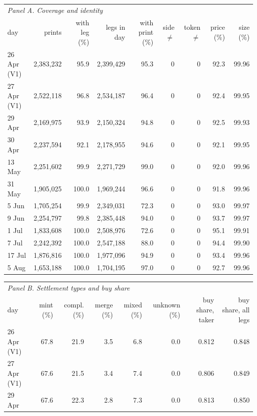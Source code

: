 \begin{table}[htbp]
\centering\scriptsize\setlength{\tabcolsep}{3pt}
\begin{tabular}{lrrrrrrrr}
\toprule
\multicolumn{9}{l}{\emph{Panel A. Coverage and identity}} \\
day & prints & with leg (\%) & legs in day & with print (\%) & side $\neq$ & token $\neq$ & price (\%) & size (\%) \\
\midrule
26 Apr (V1) & 2{,}383{,}232 & 95.9 & 2{,}399{,}429 & 95.3 & 0 & 0 & 92.3 & 99.96 \\
27 Apr (V1) & 2{,}522{,}118 & 96.8 & 2{,}534{,}187 & 96.4 & 0 & 0 & 92.4 & 99.95 \\
29 Apr & 2{,}169{,}975 & 93.9 & 2{,}150{,}324 & 94.8 & 0 & 0 & 92.5 & 99.93 \\
30 Apr & 2{,}237{,}594 & 92.1 & 2{,}178{,}955 & 94.6 & 0 & 0 & 92.1 & 99.95 \\
13 May & 2{,}251{,}602 & 99.9 & 2{,}271{,}729 & 99.0 & 0 & 0 & 92.0 & 99.96 \\
31 May & 1{,}905{,}025 & 100.0 & 1{,}969{,}244 & 96.6 & 0 & 0 & 91.8 & 99.96 \\
5 Jun & 1{,}705{,}254 & 99.9 & 2{,}349{,}031 & 72.3 & 0 & 0 & 93.0 & 99.97 \\
9 Jun & 2{,}254{,}797 & 99.8 & 2{,}385{,}448 & 94.0 & 0 & 0 & 93.7 & 99.97 \\
1 Jul & 1{,}833{,}608 & 100.0 & 2{,}508{,}976 & 72.6 & 0 & 0 & 95.1 & 99.91 \\
7 Jul & 2{,}242{,}392 & 100.0 & 2{,}547{,}188 & 88.0 & 0 & 0 & 94.4 & 99.90 \\
17 Jul & 1{,}876{,}816 & 100.0 & 1{,}977{,}096 & 94.9 & 0 & 0 & 93.4 & 99.96 \\
5 Aug & 1{,}653{,}188 & 100.0 & 1{,}704{,}195 & 97.0 & 0 & 0 & 92.7 & 99.96 \\
\bottomrule
\end{tabular}
\par\medskip
\begin{tabular}{lrrrrrrr}
\toprule
\multicolumn{8}{l}{\emph{Panel B. Settlement types and buy share}} \\
day & mint (\%) & compl. (\%) & merge (\%) & mixed (\%) & unknown (\%) & buy share, taker & buy share, all legs \\
\midrule
26 Apr (V1) & 67.8 & 21.9 & 3.5 & 6.8 & 0.0 & 0.812 & 0.848 \\
27 Apr (V1) & 67.6 & 21.5 & 3.4 & 7.4 & 0.0 & 0.806 & 0.849 \\
29 Apr & 67.6 & 22.3 & 2.8 & 7.3 & 0.0 & 0.813 & 0.850 \\

\end{tabular}
\end{table}
